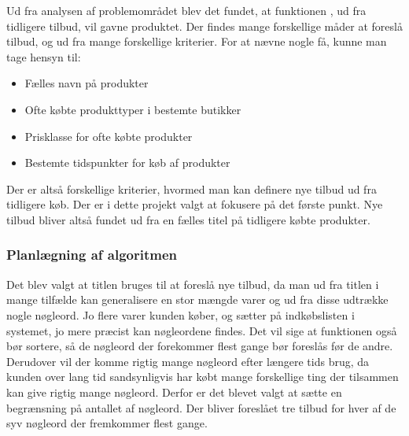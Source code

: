 Ud fra analysen af problemområdet blev det fundet, at funktionen , ud fra tidligere tilbud, vil gavne produktet. Der findes mange forskellige måder at foreslå tilbud, og ud fra mange forskellige kriterier.
For at nævne nogle få, kunne man tage hensyn til:
\begin{itemize}
	\item Fælles navn på produkter
	\item Ofte købte produkttyper i bestemte butikker
	\item Prisklasse for ofte købte produkter
	\item Bestemte tidspunkter for køb af produkter
\end{itemize}
Der er altså forskellige kriterier, hvormed man kan definere nye tilbud ud fra tidligere køb. Der er i dette projekt valgt at fokusere på det første punkt. Nye tilbud bliver altså fundet ud fra en fælles titel på tidligere købte produkter.

\subsubsection{Planlægning af algoritmen}
Det blev valgt at titlen bruges til at foreslå nye tilbud, da man ud fra titlen i mange tilfælde kan generalisere en stor mængde varer og ud fra disse udtrække nogle nøgleord. Jo flere varer kunden køber, og sætter på indkøbslisten i systemet, jo mere præcist kan nøgleordene findes. Det vil sige at funktionen også bør sortere, så de nøgleord der forekommer flest gange bør foreslås før de andre. Derudover vil der komme rigtig mange nøgleord efter længere tids brug, da kunden over lang tid sandsynligvis har købt mange forskellige ting der tilsammen kan give rigtig mange nøgleord. Derfor er det blevet valgt at sætte en begrænsning på antallet af nøgleord. Der bliver foreslået tre tilbud for hver af de syv nøgleord der fremkommer flest gange.

